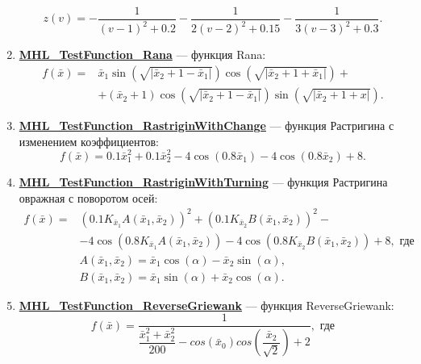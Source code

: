 \begin{enumerate}
\begin{equation*}
 z\left( v\right)= -\dfrac{1}{\left( v-1\right)^2+0.2 }-\dfrac{1}{2\left( v-2\right)^2+0.15}-\dfrac{1}{3\left( v-3\right)^2+0.3}.
 \end{equation*}
 \item \hyperref[TestFunctions:section:MHL_TestFunction_Rana]{\textbf{MHL\_TestFunction\_Rana}} --- функция Rana:
 \begin{align}
 f\left( \bar{x}\right) = & \bar{x}_1\sin\left( \sqrt{\left| \bar{x}_2+1-\bar{x}_1\right| }\right) \cos\left( \sqrt{\left| \bar{x}_2+1+\bar{x}_1\right| }\right)+  \\&+ (\bar{x}_2+1)\cos\left( \sqrt{\left| \bar{x}_2+1-\bar{x}_1\right| }\right) \sin\left( \sqrt{\left| \bar{x}_2+1+x\right| }\right).
 \end{align}
 \item \hyperref[TestFunctions:section:MHL_TestFunction_RastriginWithChange]{\textbf{MHL\_TestFunction\_RastriginWithChange}} --- функция Растригина с изменением коэффициентов:
 \begin{equation}
 f\left( \bar{x}\right) =0.1\bar{x}_1^2+0.1\bar{x}_2^2-4\cos\left( 0.8\bar{x}_1\right) -4\cos\left( 0.8\bar{x}_2\right) +8.
 \end{equation}
 \item \hyperref[TestFunctions:section:MHL_TestFunction_RastriginWithTurning]{\textbf{MHL\_TestFunction\_RastriginWithTurning}} --- функция Растригина овражная с поворотом осей:
 \begin{align}
 f\left( \bar{x}\right) =&{\left( 0.1 K_{\bar{x}_1}A\left( \bar{x}_1,\bar{x}_2\right) \right) }^2+{\left( 0.1 K_{\bar{x}_2}B\left( \bar{x}_1,\bar{x}_2\right) \right) }^2-
 \\&-4\cos\left( 0.8K_{\bar{x}_1}A\left( \bar{x}_1,\bar{x}_2\right)\right) -4\cos\left( 0.8K_{\bar{x}_2}B\left( \bar{x}_1,\bar{x}_2\right)\right) +8, \text{ где}\nonumber
 \\&A\left( \bar{x}_1,\bar{x}_2\right)= \bar{x}_1\cos\left( \alpha\right) -\bar{x}_2\sin\left( \alpha\right),\nonumber
 \\&B\left( \bar{x}_1,\bar{x}_2\right)= \bar{x}_1\sin\left( \alpha\right) +\bar{x}_2\cos\left( \alpha\right).\nonumber
 \end{align}
 \item \hyperref[TestFunctions:section:MHL_TestFunction_ReverseGriewank]{\textbf{MHL\_TestFunction\_ReverseGriewank}} --- функция ReverseGriewank:
 \begin{equation}
 f\left( \bar{x}\right) = \dfrac{1}{\dfrac{\bar{x}_1^2+\bar{x}_2^2}{200}-cos\left( \bar{x}_0\right)cos\left( \dfrac{\bar{x}_2}{\sqrt{2}}\right)+2  }, \text{ где}

\end{equation}
\end{enumerate}
